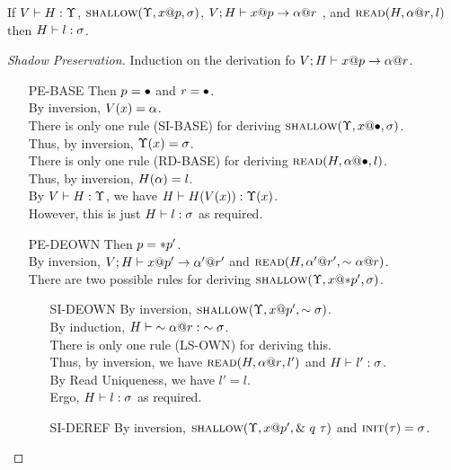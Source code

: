 \begin{lem}
  If ${V} \vdash {H} : {\Upsilon}$, $\textsc{shallow}({\Upsilon},{{x}@{p}},{\sigma})$, 
  ${V;H} \vdash {{x}@{p}} \to {{\alpha}@{r}}$ , and $\textsc{read}({H},{{\alpha}@{r}},{l})$
  then ${H} \vdash {l} : {\sigma}$.
\end{lem}

\begin{proof}[Shadow Preservation]
  Induction on the derivation fo ${V;H} \vdash {{x}@{p}} \to {{\alpha}@{r}}$.
  \begin{itemize}
    \item[\textsc{PE-BASE}] 
      Then $p = \bullet$ and $r = \bullet$.\\
      By inversion, $V(x)=\alpha$.\\
      There is only one rule (\textsc{SI-BASE}) for deriving $\textsc{shallow}({\Upsilon},{{x}@{\bullet}},{\sigma})$.\\
      Thus, by inversion, $\Upsilon(x)=\sigma$.\\
      There is only one rule (\textsc{RD-BASE}) for deriving $\textsc{read}({H},{{\alpha}@{\bullet}},{l})$.\\
      Thus, by inversion, $H(\alpha)=l$.\\
      By ${V} \vdash {H} : {\Upsilon}$, we have ${H} \vdash {H(V(x))} : {\Upsilon(x)}$. \\
      However, this is just ${H} \vdash {l} : {\sigma}$ as required.
    \item[\textsc{PE-DEOWN}] 
      Then $p = *{p'}$.\\
      By inversion, ${V;H} \vdash {{x}@{p'}} \to {{\alpha'}@{r'}}$ 
      and $\textsc{read}({H},{{\alpha'}@{r'}},{\sim{{\alpha}@{r}}})$. \\
      There are two possible rules for deriving $\textsc{shallow}({\Upsilon},{{x}@{*{p'}}},{\sigma})$.
      \begin{itemize}
	\item[\textsc{SI-DEOWN}]
	  By inversion, $\textsc{shallow}({\Upsilon},{{x}@{p'}},{\sim{\sigma}})$.\\
	  By induction, ${H} \vdash {\sim{{\alpha}@{r}}} : {\sim{\sigma}}$.\\
	  There is only one rule (\textsc{LS-OWN}) for deriving this.\\
	  Thus, by inversion, we have $\textsc{read}({H},{{\alpha}@{r}},{l'})$ and ${H} \vdash {l'} : {\sigma}$.\\
	  By Read Uniqueness, we have $l' = l$.\\
	  Ergo, ${H} \vdash {l} : {\sigma}$ as required.
	\item[\textsc{SI-DEREF}]
	  By inversion, $\textsc{shallow}({\Upsilon},{{x}@{p'}},{\&~{{q}~{\tau}}})$ and $\textsc{init}({\tau})=\sigma$.\\

\end{itemize}
\end{itemize}
\end{proof}
